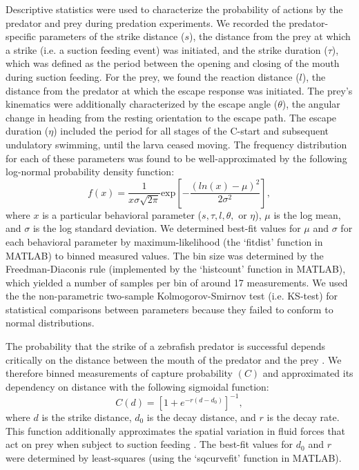 \documentclass[]{rsos}%
\begin{document}
Descriptive statistics were used to characterize the probability of actions by the predator and prey during predation experiments.
We recorded the predator-specific parameters of the strike distance ($s$), the distance from the prey at which a strike (i.e. a suction feeding event) was initiated, and the strike duration ($\tau$), which was defined as the period between the opening and closing of the mouth during suction feeding. 
For the prey, we found the reaction distance ($l$), the distance from the predator at which the escape response was initiated.
The prey's kinematics were additionally characterized by the escape angle ($\theta$), the angular change in heading from the resting orientation to the escape path.
The escape duration ($\eta$) included the period for all stages of the C-start and subsequent undulatory swimming, until the larva ceased moving.
The frequency distribution for each of these parameters was found to be well-approximated by the following log-normal probability density function:
%
\begin{equation}%
f(x) = \frac{1}{x\sigma \sqrt{2 \pi}} \text{exp} \left[ -{\frac{(ln(x)-\mu)^2}{2\sigma ^2}} \right],
\label{eqn_lognorm}
\end{equation}
%
where $x$ is a particular behavioral parameter ($s, \tau, l, \theta ,$ or $\eta$), $\mu$ is the log mean, and $\sigma$ is the log standard deviation. 
We determined best-fit values for $\mu$ and $\sigma$ for each behavioral parameter by maximum-likelihood (the `fitdist' function in MATLAB) to binned measured values.
The bin size was determined by the Freedman-Diaconis rule (implemented by the `histcount' function in MATLAB), which yielded a number of samples per bin of around 17 measurements.
We used the the non-parametric two-sample Kolmogorov-Smirnov test (i.e. KS-test) \cite{MasseyJr:1951jo} for statistical comparisons between parameters because they failed to conform to normal distributions. 

The probability that the strike of a zebrafish predator is successful depends critically on the distance between the mouth of the predator and the prey \cite{Stewart:2013bha}.
We therefore binned measurements of capture probability $(C)$ and approximated its dependency on distance with the following sigmoidal function:
%
\begin{equation}%
C(d) = \left[ 1+e^{-r(d-d_0)} \right]^{-1},
\label{eqn_sig} 
\end{equation}
%
where $d$ is the strike distance, $d_0$ is the decay distance, and $r$ is the decay rate. 
This function additionally approximates the spatial variation in fluid forces that act on prey when subject to suction feeding \cite{Wainwright:2007uq}.
The best-fit values for $d_0$ and $r$ were determined by least-squares (using the `sqcurvefit' function in MATLAB).
\end{document}
